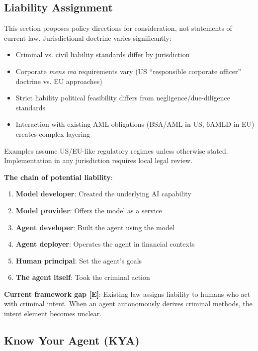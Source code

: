 \documentclass[11pt,letterpaper]{article}
\begin{document}
\subsection{Liability Assignment}

\begin{infobox}
This section proposes policy directions for consideration, not statements of current law. Jurisdictional doctrine varies significantly:
\begin{itemize}
  \item Criminal vs. civil liability standards differ by jurisdiction
  \item Corporate \textit{mens rea} requirements vary (US ``responsible corporate officer'' doctrine vs. EU approaches)
  \item Strict liability political feasibility differs from negligence/due-diligence standards
  \item Interaction with existing AML obligations (BSA/AML in US, 6AMLD in EU) creates complex layering
\end{itemize}

Examples assume US/EU-like regulatory regimes unless otherwise stated. Implementation in any jurisdiction requires local legal review.
\end{infobox}

\textbf{The chain of potential liability}:
\begin{enumerate}
  \item \textbf{Model developer}: Created the underlying AI capability
  \item \textbf{Model provider}: Offers the model as a service
  \item \textbf{Agent developer}: Built the agent using the model
  \item \textbf{Agent deployer}: Operates the agent in financial contexts
  \item \textbf{Human principal}: Set the agent's goals
  \item \textbf{The agent itself}: Took the criminal action
\end{enumerate}

\textbf{Current framework gap [E]}: Existing law assigns liability to humans who act with criminal intent. When an agent autonomously derives criminal methods, the intent element becomes unclear.

\subsection{Know Your Agent (KYA)}
\label{sec:kya}
\end{document}
